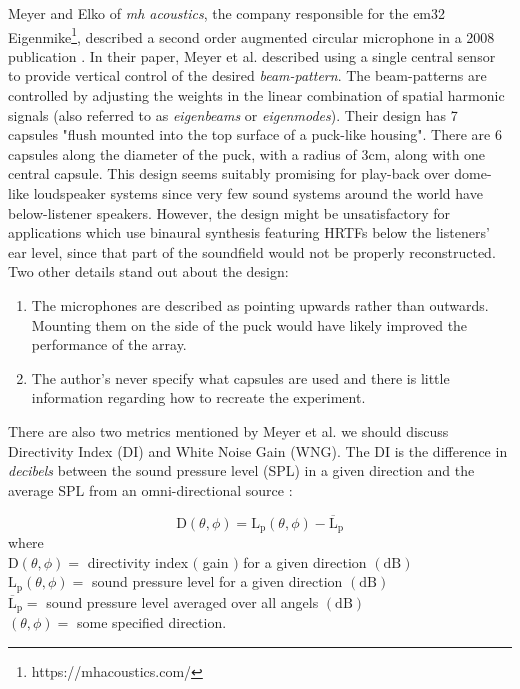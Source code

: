 Meyer and Elko of \textit{mh acoustics}, the company responsible for the em32 Eigenmike\footnote{https://mhacoustics.com/}, described a second order augmented circular microphone in a 2008 publication \cite{meyer2008spherical}. In their paper, Meyer et al. described using a single central sensor to provide vertical control of the desired \textit{beam-pattern}. The beam-patterns are controlled by adjusting the weights in the linear combination of spatial harmonic signals (also referred to as \textit{eigenbeams} or \textit{eigenmodes}). Their design has 7 capsules "flush mounted into the top surface of a puck-like housing". There are 6 capsules along the diameter of the puck, with a radius of 3cm, along with one central capsule. This design seems suitably promising for play-back over dome-like loudspeaker systems since very few sound systems around the world have below-listener speakers. However, the design might be unsatisfactory for applications which use binaural synthesis featuring HRTFs below the listeners' ear level, since that part of the soundfield would not be properly reconstructed. Two other details stand out about the design:
\begin{enumerate}
    \item The microphones are described as pointing upwards rather than outwards. Mounting them on the side of the puck would have likely improved the performance of the array. 
    \item The author's never specify what capsules are used and there is little information regarding how to recreate the experiment.
\end{enumerate}

There are also two metrics mentioned by Meyer et al. we should discuss Directivity Index (DI) and White Noise Gain (WNG). The DI is the difference in \textit{decibels} between the sound pressure level (SPL) in a given direction and the average SPL from an omni-directional source \cite{LONG201439}:

$$
\mathrm{D}(\theta, \phi)=\mathrm{L}_{\mathrm{p}}(\theta, \phi)-\overline{\mathrm{L}}_{\mathrm{p}}
$$
where \\
    $\mathrm{D}(\theta, \phi)=$ directivity index $($ gain $)$ for a given direction $(\mathrm{dB})$ \\
    $\mathrm{L}_{\mathrm{p}}(\theta, \phi)=$ sound pressure level for a given direction $(\mathrm{dB})$ \\
    $\overline{\mathrm{L}}_{\mathrm{p}}=$ sound pressure level averaged over all angels $(\mathrm{dB})$ \\
    $(\theta, \phi)=$ some specified direction.

